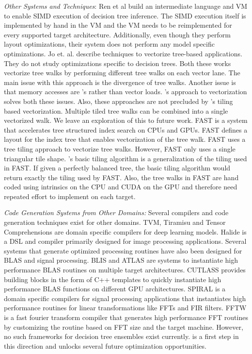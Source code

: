 \emph{Other Systems and Techniques}: 
Ren et al \cite{PortableVM} build an intermediate language and VM to 
enable SIMD execution of decision tree inference. The SIMD execution itself is implemented 
by hand in the VM and the VM needs to be reimplemented for every supported target architecture.
Additionally, even though they perform layout optimizations, their system does not perform 
any model specific optimizations. Jo et. al.\cite{MilindTreeVectorization} describe techniques 
to vectorize tree-based applications. They do not study optimizations specific to decision trees.
Both these works vectorize tree walks by performing different tree walks on each vector lane.
The main issue with this approach is the divergence of tree walks. Another issue is that 
memory accesses are 's rather than vector loads. \Treebeard{}'s approach to 
vectorization solves both these issues. Also, these approaches are not precluded 
by \Treebeard{}'s tiling based vectorization. Multiple tiled tree walks can be combined
into a single vectorized walk. We leave an exploration of this to future work. 
FAST\cite{FAST} is a system that accelerates tree structured index search 
on CPUs and GPUs. FAST defines a layout for the index tree that enables vectorization 
of the tree walk. FAST uses a tree tiling approach to vectorize tree walks. However, 
FAST only uses a single triangular tile shape. \Treebeard{}'s basic tiling algorithm 
is a generalization of the tiling used in FAST. If given a perfectly balanced tree,
the basic tiling algorithm would return exactly the tiling used by FAST. 
Also, the tree walks in FAST are hand coded using intrinsics on the CPU and CUDA 
on the GPU and therefore need repeated effort to implement on each target. 

\emph{Code Generation Systems from Other Domains:}
Several compilers and code generation techniques exist for other domains.
TVM\cite{TVM}, Tiramisu\cite{Tiramisu} and Tensor 
Comprehensions\cite{TensorComprehensions} are domain specific compilers 
for deep learning models. Halide\cite{Halide} is a DSL and compiler 
primarily designed for image processing applications. Several systems
that generate optimized processing routines have also been designed 
for BLAS and signal processing. BLIS\cite{BLIS} and ATLAS\cite{atlas_sc98}
are systems to instantiate high performance BLAS routines on multiple 
target architectures. CUTLASS\cite{CUTLASS} provides building blocks 
in the form of C++ templates to quickly instantiate high performance 
BLAS functions on different GPU architectures. SPIRAL\cite{SPIRAL}
is a domain specific compilers for signal processing applications
that instantiates high performance routines for linear transformations 
like FFTs and FIR filters. FFTW\cite{FFTW} is a fast fourier transform 
compiler that generates high performance FFT routines by customizing 
the routine based on FFT size and the target machine. 
However, no such frameworks for decision tree ensembles exist currently.
\Treebeard{} is a first step in this direction and unlocks several future 
optimization opportunities.
